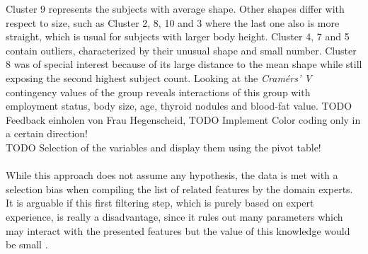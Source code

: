 \documentclass[journal]{style/vgtc} 			          %
\begin{document}
Cluster 9 represents the subjects with average shape.
%
Other shapes differ with respect to size, such as Cluster 2, 8, 10 and 3 where the last one also is more straight, which is usual for subjects with larger body height.
%
Cluster 4, 7 and 5 contain outliers, characterized by their unusual shape and small number.
%
Cluster 8 was of special interest because of its large distance to the mean shape while still exposing the second highest subject count.
%
Looking at the \emph{Cram\'{e}rs' V} contingency values of the group reveals interactions of this group with employment status, body size, age, thyroid nodules and blood-fat value.
%
TODO Feedback einholen von Frau Hegenscheid, TODO Implement Color coding only in a certain direction!\\
TODO Selection of the variables and display them using the pivot table!
\\\\
While this approach does not assume any hypothesis, the data is met with a selection bias when compiling the list of related features by the domain experts.
%
It is arguable if this first filtering step, which is purely based on expert experience, is really a disadvantage, since it rules out many parameters which may interact with the presented features but the value of this knowledge would be small \cite{Wiley2008}.
\end{document}

